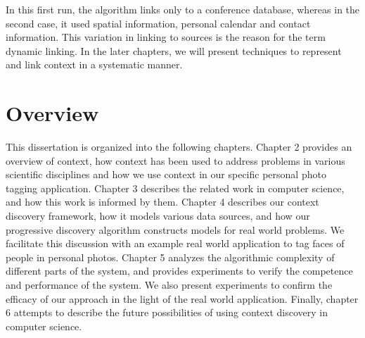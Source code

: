 In this first run, the algorithm links only to a conference database, whereas in the second case, it used spatial information, personal calendar and contact information. This variation in linking to sources is the reason for the term dynamic linking. In the later chapters, we will present techniques to represent and link context in a systematic manner.

\section{Overview}
This dissertation is organized into the following chapters. Chapter 2 provides an overview of context, how context has been used to address problems in various scientific disciplines and how we use context in our specific personal photo tagging application. Chapter 3 describes the related work in computer science, and how this work is informed by them. Chapter 4 describes our context discovery framework, how it models various data sources, and how our progressive discovery algorithm constructs models for real world problems. We facilitate this discussion with an example real world application to tag faces of people in personal photos. Chapter 5 analyzes the algorithmic complexity of different parts of the system, and provides experiments to verify the competence and performance of the system. We also present experiments to confirm the efficacy of our approach in the light of the real world application. Finally, chapter 6 attempts to describe the future possibilities of using context discovery in computer science.



